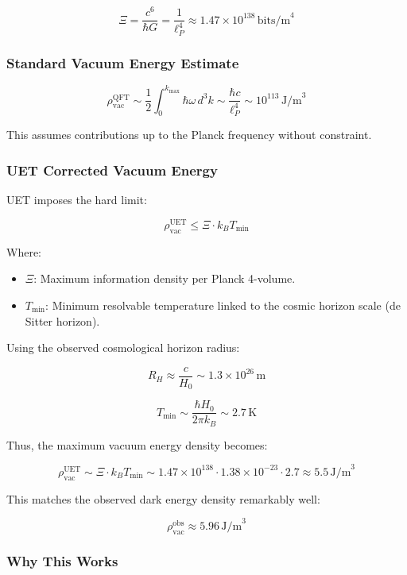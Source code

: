\documentclass[12pt,a4paper]{article}
\begin{document}
\[
\Xi = \frac{c^6}{\hbar G} = \frac{1}{\ell_P^4} \approx 1.47 \times 10^{138} \, \text{bits/m}^4
\]

\subsubsection*{Standard Vacuum Energy Estimate}

\[
\rho_{\text{vac}}^{\text{QFT}} \sim \frac{1}{2} \int_0^{k_{\text{max}}} \hbar \omega \, d^3k \sim \frac{\hbar c}{\ell_P^4} \sim 10^{113} \, \text{J/m}^3
\]

This assumes contributions up to the Planck frequency without constraint.

\subsubsection*{UET Corrected Vacuum Energy}

UET imposes the hard limit:

\[
\rho_{\text{vac}}^{\text{UET}} \leq \Xi \cdot k_B T_{\text{min}}
\]

Where:
\begin{itemize}
    \item \(\Xi\): Maximum information density per Planck 4-volume.
    \item \(T_{\text{min}}\): Minimum resolvable temperature linked to the cosmic horizon scale (de Sitter horizon).
\end{itemize}

Using the observed cosmological horizon radius:

\[
R_H \approx \frac{c}{H_0} \sim 1.3 \times 10^{26} \, \text{m}
\]

\[
T_{\text{min}} \sim \frac{\hbar H_0}{2 \pi k_B} \sim 2.7 \, \text{K}
\]

Thus, the maximum vacuum energy density becomes:

\[
\rho_{\text{vac}}^{\text{UET}} \sim \Xi \cdot k_B T_{\text{min}} \sim 1.47 \times 10^{138} \cdot 1.38 \times 10^{-23} \cdot 2.7 \approx 5.5 \, \text{J/m}^3
\]

This matches the observed dark energy density remarkably well:

\[
\rho_{\text{vac}}^{\text{obs}} \approx 5.96 \, \text{J/m}^3
\]

\subsubsection*{Why This Works}
\end{document}
